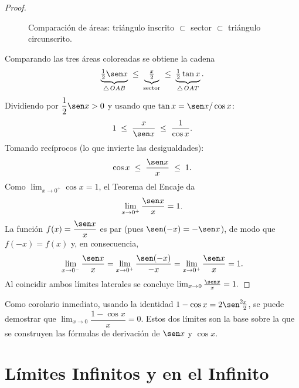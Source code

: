 \begin{proof}
\begin{figure}[!htbp]
\caption{Comparación de áreas: triángulo inscrito $\subset$ sector $\subset$
triángulo circunscrito.}
\label{fig:encaje_areas}
\end{figure}

\noindent Comparando las tres áreas coloreadas se obtiene la cadena
\[
  \underbrace{\tfrac{1}{2}\sen x}_{\triangle\,OAB}
  \;\leq\;
  \underbrace{\tfrac{x}{2}}_{\text{sector}}
  \;\leq\;
  \underbrace{\tfrac{1}{2}\tan x}_{\triangle\,OAT}.
\]
Dividiendo por $\dfrac{1}{2}\sen x > 0$ y usando que
$\tan x = \sen x/\cos x$:
\[
  1 \;\leq\; \frac{x}{\sen x} \;\leq\; \frac{1}{\cos x}.
\]
Tomando recíprocos (lo que invierte las desigualdades):
\[
  \cos x \;\leq\; \frac{\sen x}{x} \;\leq\; 1.
\]
Como $\displaystyle\lim_{x\to 0^+}\cos x = 1$, el Teorema del Encaje da
\[
  \lim_{x\to 0^+}\frac{\sen x}{x}=1.
\]
La función $f(x)=\dfrac{\sen x}{x}$ es par (pues $\sen(-x)=-\sen x$), de
modo que $f(-x)=f(x)$ y, en consecuencia,
\[
  \lim_{x\to 0^-}\frac{\sen x}{x}
  = \lim_{x\to 0^+}\frac{\sen(-x)}{-x}
  = \lim_{x\to 0^+}\frac{\sen x}{x} = 1.
\]
Al coincidir ambos límites laterales se concluye
\(
  \lim_{x \to 0} \frac{\sen x}{x} = 1.
\)
\end{proof}

\begin{rem}
Como corolario inmediato, usando la identidad $1-\cos x = 2\sen^2\!\frac{x}{2}$,
se puede demostrar que $\lim_{x\to 0}\dfrac{1-\cos x}{x} = 0$. Estos dos
límites son la base sobre la que se construyen las fórmulas de derivación de
$\sen x$ y $\cos x$.
\end{rem}

\section{Límites Infinitos y en el Infinito}

